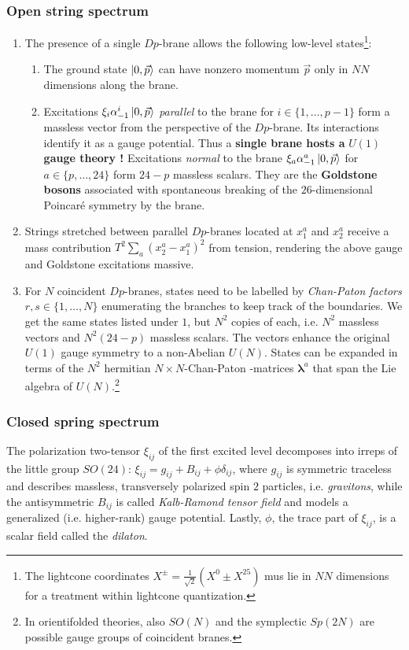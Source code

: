 \subsubsection{Open string spectrum}
\begin{enumerate}
	\item The presence of a single $Dp$-brane allows the following low-level states\footnote{The lightcone coordinates $X^\pm=\frac{1}{\sqrt{2}}(X^0 \pm X^{25}) $ mus lie in $NN$ dimensions for a treatment within lightcone quantization. }:
	\begin{enumerate}
		\item The ground state $\ket{0,\vec{p}}$ can have nonzero momentum $\vec{p}$ only in $NN$ dimensions along the brane.
		\item Excitations $\xi_i \alpha^i_{-1}\ket{0,\vec{p}}$ \emph{parallel} to the brane for $i\in \{1,\dots,p-1\}$ form a massless vector from the perspective of the $Dp$-brane. Its interactions identify it as a gauge potential. Thus a \textbf{single brane hosts a }$U(1)$ \textbf{ gauge theory !} Excitations \emph{normal} to the brane $\xi_a \alpha^a_{-1} \ket{0,\vec{p}}$ for $a\in \{p,\dots,24 \}$ form $24-p$ massless scalars. They are the \textbf{Goldstone bosons} associated with spontaneous breaking of the $26$-dimensional Poincaré symmetry by the brane.
	\end{enumerate}
\item Strings stretched between parallel $Dp$-branes located at $x^a_1$ and $x^a_2$ receive a mass contribution $T^2 \sum_a (x^a_2-x^a_1)^2$ from tension, rendering the above gauge and Goldstone excitations massive.
\item For $N$ coincident $Dp$-branes, states need to be labelled by \emph{Chan-Paton factors} $r,s\in \{1,\dots,N\}$ enumerating the branches to keep track of the boundaries. We get the same states listed under $1$, but $N^2$ copies of each, i.e. $N^2$ massless vectors and $N^2(24-p)$ massless scalars. The vectors enhance the original $U(1)$ gauge symmetry to a non-Abelian $U(N)$. States can be expanded in terms of the $N^2$ hermitian $N\times N$-Chan-Paton -matrices $\mathbf{\lambda}^a$ that span the Lie algebra of $U(N)$.\footnote{In orientifolded theories, also $SO(N)$ and the symplectic $Sp(2N)$ are possible gauge groups of coincident branes.}
\end{enumerate}
\subsubsection{Closed spring spectrum}
The polarization two-tensor $\xi_{ij}$ of the first excited level decomposes into irreps of the little group $SO(24)$: $\xi_{ij}=g_{ij}+B_{ij}+\phi \delta_{ij}$, where $g_{ij}$ is symmetric traceless and describes massless, transversely polarized spin $2$ particles, i.e. \emph{gravitons}, while the antisymmetric $B_{ij}$ is called \emph{Kalb-Ramond tensor field} and models a generalized (i.e. higher-rank) gauge potential. Lastly, $\phi$, the trace part of $\xi_{ij}$, is a scalar field called the \emph{dilaton}.

